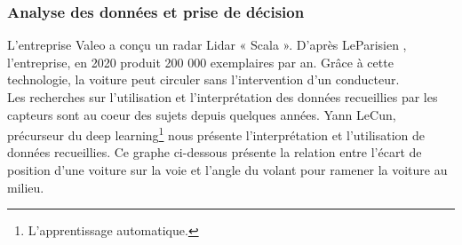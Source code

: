\subsubsection{Analyse des données et prise de décision}
L'entreprise Valeo a conçu un radar Lidar « Scala ». D'après LeParisien \cite{le_parisien_radar_2019}, l'entreprise, en 2020 produit 200 000 exemplaires par an. Grâce à cette technologie, la voiture peut circuler sans l’intervention d’un conducteur.\\
Les recherches sur l'utilisation et l'interprétation des données recueillies par les capteurs sont au coeur des sujets depuis quelques années. Yann LeCun, précurseur du deep learning\footnote{L'apprentissage automatique.} nous présente l'interprétation et l'utilisation de données recueillies.
Ce graphe ci-dessous présente la relation entre l’écart de position d’une voiture sur la voie et l’angle du volant pour ramener la voiture au milieu. 

